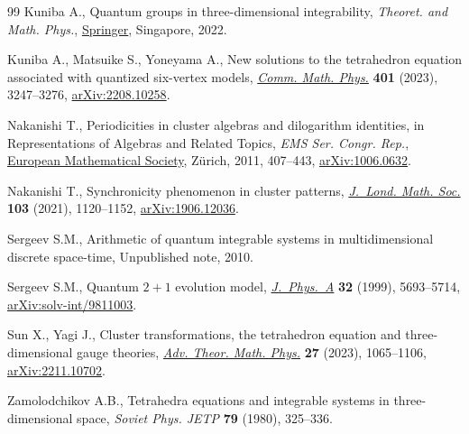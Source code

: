 \documentclass[pdftex]{sigma}
\numberwithin{equation}{section}
\begin{document}
\begin{thebibliography}{99}
Kuniba A., Quantum groups in three-dimensional integrability, \textit{Theoret. and Math. Phys.}, \href{https://doi.org/10.1007/978-981-19-3262-5}{Springer}, Singapore, 2022.

Kuniba A., Matsuike S., Yoneyama A., New solutions to the tetrahedron equation
 associated with quantized six-vertex models, \href{https://doi.org/10.1007/s00220-023-04711-y}{\textit{Comm. Math. Phys.}}
 \textbf{401} (2023), 3247--3276, \href{https://arxiv.org/abs/2208.10258}{arXiv:2208.10258}.

Nakanishi T., Periodicities in cluster algebras and dilogarithm identities, in
 Representations of {A}lgebras and {R}elated {T}opics, \textit{EMS Ser. Congr. Rep.},
 \href{https://doi.org/10.4171/101-1/9}{European Mathematical Society}, Z\"urich, 2011, 407--443, \href{https://arxiv.org/abs/1006.0632}{arXiv:1006.0632}.

Nakanishi T., Synchronicity phenomenon in cluster patterns, \href{https://doi.org/10.1112/jlms.12402}{\textit{J.~Lond.
 Math. Soc.}} \textbf{103} (2021), 1120--1152, \href{https://arxiv.org/abs1906.12036}{arXiv:1906.12036}.

Sergeev S.M., Arithmetic of quantum integrable systems in multidimensional
 discrete space-time, {U}npublished note, 2010.

Sergeev S.M., Quantum {$2+1$} evolution model, \href{https://doi.org/10.1088/0305-4470/32/30/313}{\textit{J.~Phys.~A}} \textbf{32}
 (1999), 5693--5714, \href{https://arxiv.org/abs/solv-int/9811003}{arXiv:solv-int/9811003}.

Sun X., Yagi J., Cluster transformations, the tetrahedron equation and
 three-dimensional gauge theories, \href{https://doi.org/10.4310/atmp.2023.v27.n4.a2}{\textit{Adv. Theor. Math. Phys.}}
 \textbf{27} (2023), 1065--1106, \href{https://arxiv.org/abs/2211.10702}{arXiv:2211.10702}.

Zamolodchikov A.B., Tetrahedra equations and integrable systems in
 three-dimensional space, \textit{Soviet Phys. JETP} \textbf{79} (1980),
 325--336.

\end{thebibliography}\LastPageEnding
\end{document}
